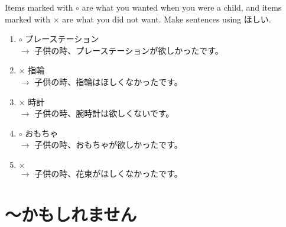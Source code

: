 \documentclass[notoc,notitlepage]{tufte-book}
\begin{document}
\begin{ex}
  Items marked with $\circ$ are what you wanted when you were a child, and items marked with $\times$ are what you did not want. Make sentences using ほしい.

  \begin{enumerate}
    \item $\circ$ プレーステーション \\
      $\to$ 子供の時、プレーステーションが欲しかったです。
    \item $\times$ 指輪 \\
      $\to$ 子供の時、指輪はほしくなかったです。
    \item $\times$ 時計 \\
      $\to$ 子供の時、腕時計は欲しくないです。
    \item $\circ$ おもちゃ \\
      $\to$ 子供の時、おもちゃが欲しかったです。
    \item $\times$  \\
      $\to$ 子供の時、花束がほしくなかったです。
  \end{enumerate}
\end{ex}


\section{〜かもしれません}%
\label{sec:_kamoshiremasen}
\end{document}
